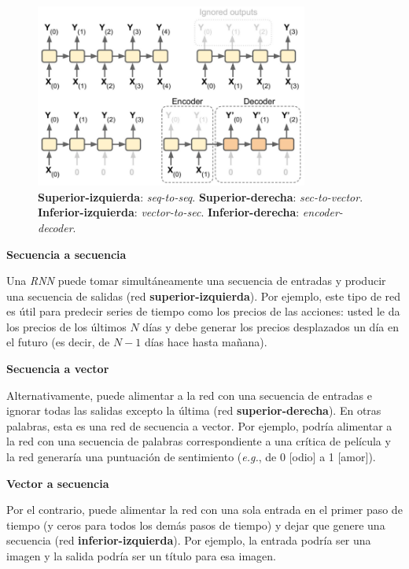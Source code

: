 \documentclass[a4paper,12pt]{article}
\begin{document}
\begin{figure}[H]
	\begin{center}				
		\includegraphics[width=0.80\textwidth]{tesis_42.png}
		\caption{\textbf{Superior-izquierda}: \textit{seq-to-seq}. \textbf{Superior-derecha}: \textit{sec-to-vector}. \textbf{Inferior-izquierda}: \textit{vector-to-sec}. \textbf{Inferior-derecha}: \textit{encoder-decoder}. \citep{geron}}
		\label{fig:rnnnets}
	\end{center}
\end{figure}

\textbf{Secuencia a secuencia}

Una \textit{RNN} puede tomar simultáneamente una secuencia de entradas y producir una secuencia de salidas (red \textbf{superior-izquierda}). Por ejemplo, este tipo de red es útil para predecir series de tiempo como los precios de las acciones: usted le da los precios de los últimos $N$ días y debe generar los precios desplazados un día en el futuro (es decir, de $N - 1$ días hace hasta mañana).

\textbf{Secuencia a vector}

Alternativamente, puede alimentar a la red con una secuencia de entradas e ignorar todas las salidas excepto la última (red \textbf{superior-derecha}). En otras palabras, esta es una red de secuencia a vector. Por ejemplo, podría alimentar a la red con una secuencia de palabras correspondiente a una crítica de película y la red generaría una puntuación de sentimiento (\textit{e.g.}, de 0 [odio] a 1 [amor]).

\textbf{Vector a secuencia}

Por el contrario, puede alimentar la red con una sola entrada en el primer paso de tiempo (y ceros para todos los demás pasos de tiempo) y dejar que genere una secuencia (red \textbf{inferior-izquierda}). Por ejemplo, la entrada podría ser una imagen y la salida podría ser un título para esa imagen.
\end{document}
